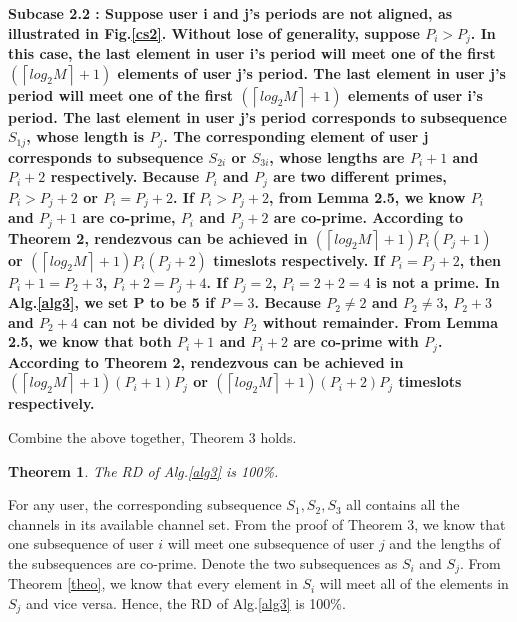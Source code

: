 \documentclass[10pt, conference, letterpaper]{IEEEtran}
\newtheorem{theorem}{Theorem}
\begin{document}
\begin{IEEEproof}
\bfseries Subcase 2.2 \mdseries: Suppose user i and j's periods are not aligned, as illustrated in Fig.\ref{cs2}. Without lose of generality, suppose $P_i > P_j$. In this case, the last element in user i's period will meet one of the first $(\left \lceil log_2M \right \rceil + 1)$ elements of user j's period. The last element in user j's period will meet one of the first $(\left \lceil log_2M \right \rceil + 1)$ elements of user i's period. The last element in user j's period corresponds to subsequence $S_{1j}$, whose length is $P_j$. The corresponding element of user j corresponds to subsequence $S_{2i}$ or $S_{3i}$, whose lengths are $P_i +1$ and $P_i +2$ respectively. Because $P_i$ and $P_j$ are two different primes, $P_i > P_j +2$ or $P_i = P_j +2$. If $P_i > P_j + 2$, from Lemma 2.5, we know $P_i$ and $P_j + 1$ are co-prime, $P_i$ and $P_j +2 $ are co-prime. According to Theorem 2, rendezvous can be achieved in $(\left \lceil log_2M \right \rceil + 1)P_i(P_j+1)$ or $(\left \lceil log_2M \right \rceil + 1)P_i(P_j+2)$ timeslots respectively. If $P_i = P_j + 2$, then $P_i + 1 = P_2 + 3$, $P_i + 2 = P_j + 4$. If $P_j = 2$, $P_i = 2 + 2=4$ is not a prime. In Alg.\ref{alg3}, we set P to be 5 if $P=3$. Because $P_2 \ne 2$ and $P_2 \ne 3$, $P_2 + 3$ and $P_2 + 4$ can not be divided by $P_2$ without remainder. From Lemma 2.5, we know that both $P_i + 1$ and $P_i +2$ are co-prime with $P_j$. According to Theorem 2, rendezvous can be achieved in $(\left \lceil log_2M \right \rceil + 1)(P_i + 1)P_j$ or $(\left \lceil log_2M \right \rceil + 1)(P_i+2)P_j$ timeslots respectively.

Combine the above together, Theorem 3 holds.

\end{IEEEproof}

\begin{theorem}
The RD of Alg.\ref{alg3} is 100\%.
\end{theorem}

\begin{IEEEproof}
For any user, the corresponding subsequence $S_1,S_2,S_3$ all contains all the channels in its available channel set. From the proof of Theorem 3, we know that one subsequence of user $i$ will meet one subsequence of user $j$ and the lengths of the subsequences are co-prime. Denote the two subsequences as $S_i$ and $S_j$. From Theorem \ref{theo}, we know that every element in $S_i$ will meet all of the elements in $S_j$ and vice versa. Hence, the RD of Alg.\ref{alg3} is 100\%.
\end{IEEEproof}
\end{document}
